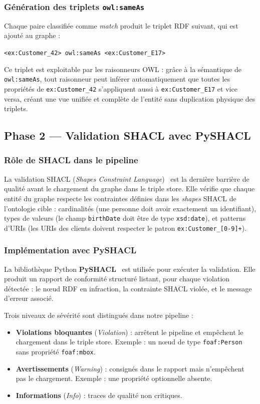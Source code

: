 \subsubsection{Génération des triplets \texttt{owl:sameAs}}
Chaque paire classifiée comme \textit{match} produit le triplet RDF suivant,
qui est ajouté au graphe :

\begin{center}
\texttt{<ex:Customer\_42> owl:sameAs <ex:Customer\_E17>}
\end{center}

Ce triplet est exploitable par les raisonneurs OWL : grâce à la sémantique de
\texttt{owl:sameAs}, tout raisonneur peut inférer automatiquement que toutes les
propriétés de \texttt{ex:Customer\_42} s'appliquent aussi à
\texttt{ex:Customer\_E17} et vice versa, créant une vue unifiée et complète de
l'entité sans duplication physique des triplets.

\subsection{Phase 2 — Validation SHACL avec PySHACL}

\subsubsection{Rôle de SHACL dans le pipeline}
La validation SHACL (\textit{Shapes Constraint Language})~\cite{knublauch2017shacl}
est la dernière barrière de qualité avant le chargement du graphe dans le triple
store.
Elle vérifie que chaque entité du graphe respecte les contraintes définies dans
les \textit{shapes} SHACL de l'ontologie cible : cardinalités (une personne doit
avoir exactement un identifiant), types de valeurs (le champ \texttt{birthDate}
doit être de type \texttt{xsd:date}), et patterns d'URIs (les URIs des clients
doivent respecter le patron \texttt{ex:Customer\_[0-9]+}).

\subsubsection{Implémentation avec PySHACL}
La bibliothèque Python \textbf{PySHACL}~\cite{pyshacl2020} est utilisée pour
exécuter la validation.
Elle produit un rapport de conformité structuré listant, pour chaque violation
détectée : le nœud RDF en infraction, la contrainte SHACL violée, et le message
d'erreur associé.

Trois niveaux de sévérité sont distingués dans notre pipeline :
\begin{itemize}
    \item \textbf{Violations bloquantes} (\textit{Violation}) : arrêtent le
          pipeline et empêchent le chargement dans le triple store.
          Exemple : un nœud de type \texttt{foaf:Person} sans propriété
          \texttt{foaf:mbox}.
    \item \textbf{Avertissements} (\textit{Warning}) : consignés dans le rapport
          mais n'empêchent pas le chargement.
          Exemple : une propriété optionnelle absente.
    \item \textbf{Informations} (\textit{Info}) : traces de qualité non critiques.
\end{itemize}

